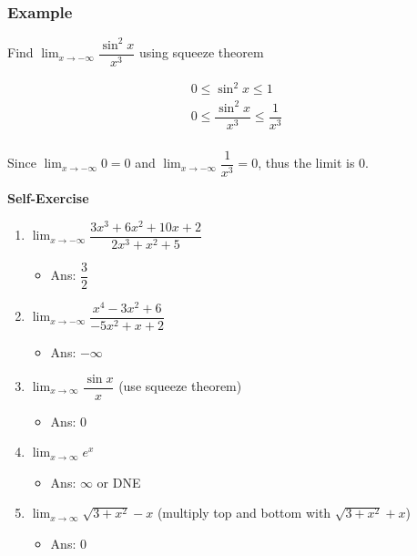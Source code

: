 \documentclass[t]{beamer}
\theoremstyle{plain}
\theoremstyle{definition}
\newcounter{heading}
\newcommand{\makeheading}[1]{\medskip\begin{large}\noindent\textbf{{#1}}\end{large}\smallskip}
\newcommand{\limm}[1]{\displaystyle \lim_{x\to #1}}
\begin{document}
\begin{frame}
\frametitle{Example}
	Find $\limm{-\infty}\dfrac{\sin^2{x}}{x^3}$ using squeeze theorem
	
	\begin{align*}
  	0 \leq \sin^2{x} \leq 1\\
  	0 \leq \dfrac{\sin^2{x}}{x^3} \leq \dfrac{1}{x^3}\\
	\end{align*}	
	
	Since $\limm{-\infty} 0 = 0$ and $\limm{-\infty} \dfrac{1}{x^3} = 0$, thus the limit is 0.
	
\end{frame}

\begin{frame}
\makeheading{Self-Exercise}
\footnotesize
\begin{enumerate}

\item $\limm{-\infty}\dfrac{3x^3 + 6x^2 + 10x + 2}{2x^3 + x^2 + 5}$
\begin{itemize}
	\item Ans: $\dfrac{3}{2}$
\end{itemize}

\item $\limm{-\infty}\dfrac{x^4 - 3x^2 + 6}{-5x^2 + x + 2}$
\begin{itemize}
	\item Ans: $-\infty$
\end{itemize}

\item $\limm{\infty}\dfrac{\sin{x}}{x}$  \qquad(use squeeze theorem)
\begin{itemize}
	\item Ans: $0$
\end{itemize}

\item $\limm{\infty}e^x$ 
\begin{itemize}
	\item Ans: $\infty$ or DNE
\end{itemize}

\item $\limm{\infty}\sqrt{3 + x^2} - x$  \qquad (multiply top and bottom with  $\sqrt{3 + x^2} + x$)
\begin{itemize}
	\item Ans: 0
\end{itemize}

\end{enumerate}

\end{frame}
\end{document}
